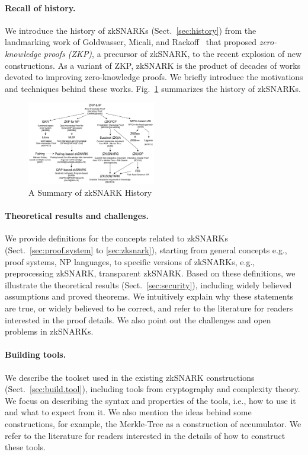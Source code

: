 \documentclass[acmtog]{acmart}
\begin{document}
\paragraph{Recall of history.} We introduce the history of zkSNARKs (Sect.~\ref{sec:history}) from the landmarking work of Goldwasser, Micali, and Rackoff~\cite{GoldwasserMR85} that proposed \emph{zero-knowledge proofs (ZKP)}, a precursor of zkSNARK, to the recent explosion of new constructions.
As a variant of ZKP, zkSNARK is the product of decades of works devoted to improving zero-knowledge proofs.
We briefly introduce the motivations and techniques behind these works.
Fig.~\ref{fig:history} summarizes the history of zkSNARKs.

\begin{figure}[ht!]
\includegraphics[width=0.5\textwidth]{images/zksnark-history.pdf}
\caption{A Summary of zkSNARK History}
\label{fig:history}
\Description{}
\end{figure}

\paragraph{Theoretical results and challenges.}
We provide definitions for the concepts related to zkSNARKs (Sect.~\ref{sec:proof.system} to \ref{sec:zksnark}), starting from general concepts e.g., proof systems, NP languages, to specific versions of zkSNARKs, e.g., preprocessing zkSNARK, transparent zkSNARK.
Based on these definitions, we illustrate the theoretical results (Sect.~\ref{sec:security}), including widely believed assumptions and proved theorems.
We intuitively explain why these statements are true, or widely believed to be correct, and refer to the literature for readers interested in the proof details.
We also point out the challenges and open problems in zkSNARKs.

\paragraph{Building tools.}
We describe the toolset used in the existing zkSNARK constructions (Sect.~\ref{sec:build.tool}), including tools from cryptography and complexity theory.
We focus on describing the syntax and properties of the tools, i.e., how to use it and what to expect from it.
We also mention the ideas behind some constructions, for example, the Merkle-Tree as a construction of accumulator.
We refer to the literature for readers interested in the details of how to construct these tools.
\end{document}

